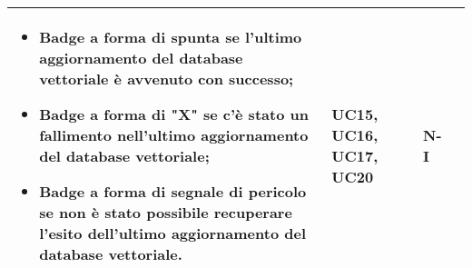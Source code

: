 \begin{table}[h!]
\begin{tabularx}{\textwidth}{|p{}|X|p{}|p{}|}
    \begin{itemize}
        \item Badge a forma di spunta se l'ultimo aggiornamento del database vettoriale è avvenuto con successo;
        \item Badge a forma di "X" se c'è stato un fallimento nell'ultimo aggiornamento del database vettoriale;
        \item Badge a forma di segnale di pericolo se non è stato possibile recuperare l'esito dell'ultimo aggiornamento del database vettoriale.
    \end{itemize} 
        & UC15, UC16, UC17, UC20 & N-I \\ \hline

    \end{tabularx}
\end{table}

\newpage

